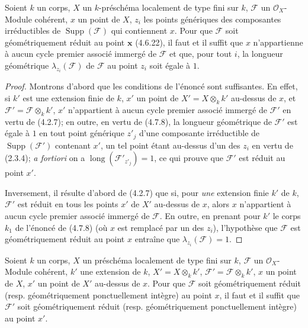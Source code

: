 \begin{proposition}[4.7.10]
\label{IV.2.4.7.10-fr}
Soient $k$ un corps, $X$ un $k$-préschéma localement de type fini sur $k$,
$\mathscr F$ un $\mathcal O_X$-Module cohérent, $x$ un point de $X$, $z_i$
les points génériques des composantes irréductibles de
$\operatorname{Supp}(\mathscr F)$ qui contiennent $x$. Pour que $\mathscr F$
soit géométriquement réduit au point $\boldsymbol{x}$ \textup{(4.6.22)}, il faut et il suffit que
$x$ n'appartienne à aucun cycle premier associé immergé de $\mathscr F$ et
que, pour tout $i$, la longueur géométrique $\lambda_{z_i}(\mathscr F)$ de
$\mathscr F$ au point $z_i$ soit égale à $1$.
\end{proposition}

\begin{proof}
Montrons d'abord que les conditions de l'énoncé sont suffisantes. En effet, si
$k'$ est une extension finie de $k$, $x'$ un point de
$X'=X\otimes_k k'$ au-dessus de $x$, et
$\mathscr F'=\mathscr F\otimes_k k'$, $x'$ n'appartient à aucun cycle premier
associé immergé de $\mathscr F'$ en vertu de (4.2.7); en outre, en vertu de
(4.7.8), la longueur géométrique de $\mathscr F'$ est égale à $1$ en tout
point générique $z'_j$ d'une composante irréductible de
$\operatorname{Supp}(\mathscr F')$ contenant $x'$, un tel point étant
au-dessus d'un des $z_i$ en vertu de (2.3.4); \emph{a fortiori} on a
$\operatorname{long}(\mathscr F'_{z'_j})=1$, ce qui prouve que $\mathscr F'$
est réduit au point $x'$.

Inversement, il résulte d'abord de (4.2.7) que si, pour \emph{une} extension finie
$k'$ de $k$, $\mathscr F'$ est réduit en tous les points $x'$ de $X'$
au-dessus de $x$, alors $x$ n'appartient à aucun cycle premier associé immergé
de $\mathscr F$. En outre, en prenant pour $k'$ le corps $k_1$ de l'énoncé de
(4.7.8) (où $x$ est remplacé par un des $z_i$), l'hypothèse que $\mathscr F$
est géométriquement réduit au point $x$ entraîne que
$\lambda_{z_i}(\mathscr F)=1$.
\end{proof}

\begin{proposition}[4.7.11]
\label{IV.2.4.7.11-fr}
Soient $k$ un corps, $X$ un préschéma localement de type fini sur $k$,
$\mathscr F$ un $\mathcal O_X$-Module cohérent, $k'$ une extension de $k$,
$X'=X\otimes_k k'$, $\mathscr F'=\mathscr F\otimes_k k'$, $x$ un point de
$X$, $x'$ un point de $X'$ au-dessus de $x$. Pour que $\mathscr F$ soit
géométriquement réduit \textup{(resp.} géométriquement ponctuellement intègre\textup{)} au point
$x$, il faut et il suffit que $\mathscr F'$ soit géométriquement réduit \textup{(resp.}
géométriquement ponctuellement intègre\textup{)} au point $x'$.
\end{proposition}


